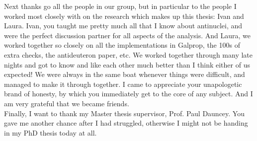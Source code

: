 Next thanks go all the people in our group, but in particular to the people I worked most closely with on the research which makes up this thesis: Ivan and Laura. Ivan, you taught me pretty much all that I know about antinuclei, and were the perfect discussion partner for all aspects of the analysis. And Laura, we worked together so closely on all the implementations in Galprop, the 100s of extra checks, the antideuteron paper, etc. We worked together through many late nights and got to know and like each other much better than I think either of us expected! We were always in the same boat whenever things were difficult, and managed to make it through together. I came to appreciate your unapologetic brand of honesty, by which you immediately get to the core of any subject. And I am very grateful that we became friends. \\

Finally, I want to thank my Master thesis supervisor, Prof. Paul Dauncey. You gave me another chance after I had struggled, otherwise I might not be handing in my PhD thesis today at all. 


\newpage
